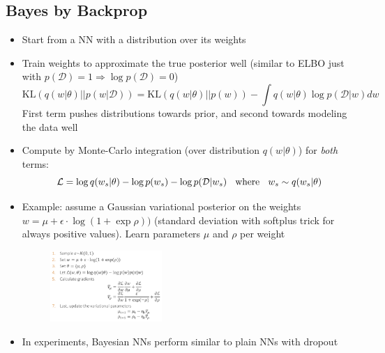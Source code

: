 \subsection{Bayes by Backprop}
\begin{itemize}
	\item Start from a NN with a distribution over its weights
	\item Train weights to approximate the true posterior well (similar to ELBO just with $p(\mathcal{D})=1 \Rightarrow \log p(\mathcal{D}) = 0$)
	$$\text{KL}\left(q\left(w|\theta\right)||p\left(w|\mathcal{D}\right)\right) = \text{KL}\left(q\left(w|\theta\right)||p\left(w\right)\right) - \int q(w|\theta) \log p(\mathcal{D}|w)dw$$
	First term pushes distributions towards prior, and second towards modeling the data well
	\item Compute by Monte-Carlo integration (over distribution $q(w|\theta)$) for \textit{both} terms:
	$$\mathcal{L} = \log q(w_s|\theta) - \log p(w_s) - \log p(\mathcal{D}|w_s) \hspace{2mm}\text{ where }\hspace{2mm} w_s\sim q(w_s|\theta)$$
	\item Example: assume a Gaussian variational posterior on the weights $w=\mu + \epsilon \cdot \log(1 + \exp\rho))$ (standard deviation with softplus trick for always positive values). Learn parameters $\mu$ and $\rho$ per weight
	\begin{figure}[ht!]
		\centering
		\includegraphics[width=0.4\textwidth]{figures/Bayes_By_Backprop.png}
	\end{figure}
	\item In experiments, Bayesian NNs perform similar to plain NNs with dropout
\end{itemize}